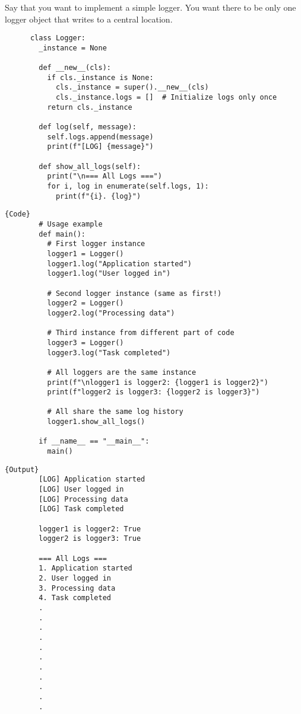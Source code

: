   \begin{example}[Logger]
    Say that you want to implement a simple logger. You want there to be only one logger object that writes to a central location. 

    \begin{lstlisting}
      class Logger:
        _instance = None
        
        def __new__(cls):
          if cls._instance is None:
            cls._instance = super().__new__(cls)
            cls._instance.logs = []  # Initialize logs only once
          return cls._instance
        
        def log(self, message):
          self.logs.append(message)
          print(f"[LOG] {message}")
        
        def show_all_logs(self):
          print("\n=== All Logs ===")
          for i, log in enumerate(self.logs, 1):
            print(f"{i}. {log}")
    \end{lstlisting}

    \noindent\begin{minipage}{.65\textwidth}
      \begin{lstlisting}[]{Code}
        # Usage example
        def main():
          # First logger instance
          logger1 = Logger()
          logger1.log("Application started")
          logger1.log("User logged in")
          
          # Second logger instance (same as first!)
          logger2 = Logger()
          logger2.log("Processing data")
          
          # Third instance from different part of code
          logger3 = Logger()
          logger3.log("Task completed")
          
          # All loggers are the same instance
          print(f"\nlogger1 is logger2: {logger1 is logger2}")
          print(f"logger2 is logger3: {logger2 is logger3}")
          
          # All share the same log history
          logger1.show_all_logs()

        if __name__ == "__main__":
          main() 
      \end{lstlisting}
      \end{minipage}
      \hfill
      \begin{minipage}{.34\textwidth}
      \begin{lstlisting}[]{Output}
        [LOG] Application started
        [LOG] User logged in
        [LOG] Processing data
        [LOG] Task completed

        logger1 is logger2: True
        logger2 is logger3: True

        === All Logs ===
        1. Application started
        2. User logged in
        3. Processing data
        4. Task completed
        .
        .
        .
        .
        .
        .
        .
        .
        .
        .
        .
      \end{lstlisting}
    \end{minipage}
  \end{example}

